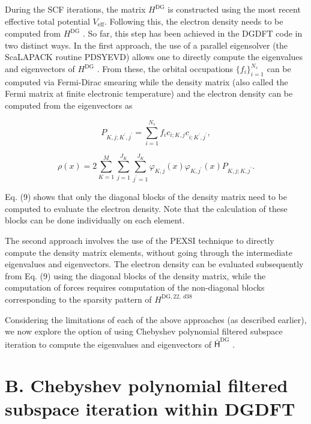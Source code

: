 \documentclass[
  10
]{article}
\begin{document}
During the SCF iterations, the matrix \(H ^ { \mathrm { D G } }\) is
constructed using the most recent effective total potential
\(V _ { \mathrm { e f f } } .\) Following this, the electron density
needs to be computed from \(H ^ { \mathrm { D \bar { G } } }\) . So far,
this step has been achieved in the DGDFT code in two distinct ways. In
the first approach, the use of a parallel eigensolver (the ScaLAPACK
routine PDSYEVD) allows one to directly compute the eigenvalues and
eigenvectors of \(H ^ { \mathrm { D G } }\) . From these, the orbital
occupations \(\{ f _ { i } \} _ { i = 1 } ^ { N _ { s } }\) can be
computed via Fermi-Dirac smearing while the density matrix (also called
the Fermi matrix at finite electronic temperature) and the electron
density can be computed from the eigenvectors as

\[
P _ {K, j; K ^ {\prime}, j ^ {\prime}} = \sum_ {i = 1} ^ {N _ {s}} f _ {i} c _ {i; K, j} c _ {i; K ^ {\prime}, j ^ {\prime}}, \tag {8}
\]

\[
\rho (x) = 2 \sum_ {K = 1} ^ {M} \sum_ {j = 1} ^ {J _ {K}} \sum_ {j ^ {\prime} = 1} ^ {J _ {K}} \varphi_ {K, j} (x) \varphi_ {K, j ^ {\prime}} (x) P _ {K, j; K, j ^ {\prime}}. \tag {9}
\]

Eq. (9) shows that only the diagonal blocks of the density matrix need
to be computed to evaluate the electron density. Note that the
calculation of these blocks can be done individually on each element.

The second approach involves the use of the PEXSI technique to directly
compute the density matrix elements, without going through the
intermediate eigenvalues and eigenvectors. The electron density can be
evaluated subsequently from Eq. (9) using the diagonal blocks of the
density matrix, while the computation of forces requires computation of
the non-diagonal blocks corresponding to the sparsity pattern of
\(H ^ { \mathrm { D G } , 2 2 , \ d 3 8 }\)

Considering the limitations of each of the above approaches (as
described earlier), we now explore the option of using Chebyshev
polynomial filtered subspace iteration to compute the eigenvalues and
eigenvectors of \(\mathsf { \bar { H } } ^ { \mathrm { D G } }\) .

\section{B. Chebyshev polynomial filtered subspace iteration within
DGDFT}\label{b.-chebyshev-polynomial-filtered-subspace-iteration-within-dgdft}
\end{document}

